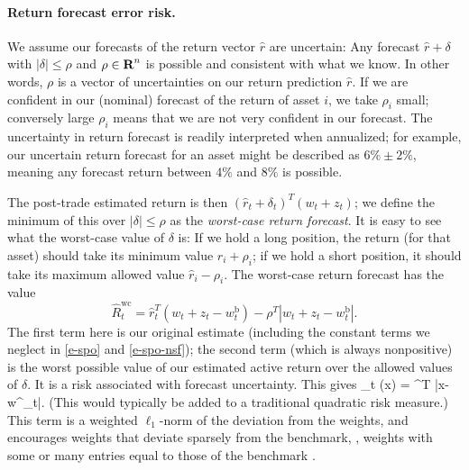 \documentclass[openany]{article}  %
\newcommand{\wb}{w^\mathrm{b}}
\begin{document}
\paragraph{Return forecast error risk.}
We assume our forecasts of the return vector $\hat r$
are uncertain: Any forecast $\hat r + \delta$ with $|\delta| \leq \rho$
and $\rho \in {\mbox{\bf R}}^n$ is possible and consistent with what we know.
In other words,
$\rho$ is a vector of uncertainties on our return prediction $\hat r$.
If we are confident in our (nominal) forecast of the return of asset $i$, we take
$\rho_i$ small; conversely large $\rho_i$ means that we are not
very confident in our forecast.
The uncertainty in return forecast is readily interpreted when
annualized; for example, our uncertain return forecast for an asset might be
described as $6\% \pm 2\%$, meaning any forecast return between
$4\%$ and $8\%$ is possible.

The post-trade estimated return is then
$(\hat r_t + \delta_t)^T (w_t+z_t)$;
we define the minimum of this over $|\delta| \leq \rho$ as the
\emph{worst-case return forecast}.  It is easy to see
what the worst-case value of $\delta$ is: If we hold a long position,
the return (for that asset) should take its minimum value $\hat r_i + \rho_i$;
if we hold a short position, it should take its
maximum allowed value $\hat r_i - \rho_i$.
The worst-case return forecast has the value
\[
\hat R^\mathrm{wc}_t = \hat r_t^T(w_t + z_t-\wb_t) - \rho^T |w_t + z_t-\wb_t|.
\]
The first term here is our original estimate
(including the constant terms we neglect in \eqref{e-spo} and \eqref{e-spo-nsf});
the second term (which is always
nonpositive) is the worst possible value of our estimated active return over
the allowed values of $\delta$.  It is a risk associated with forecast
uncertainty.
This gives
\BEQ\label{e-return-forecast-risk}
\psi_t (x) = \rho^T |x-\wb_t|.
\EEQ
(This would typically be added to a traditional quadratic risk measure.)
This term is a weighted $\ell_1$-norm of the deviation from the weights,
and encourages weights that deviate sparsely from the benchmark,
\ie, weights with some or many entries equal to those of the
benchmark \cite{tibshirani1996regression, fastrich2015constructing,ho2015weighted,li2015sparse}.
\end{document}
